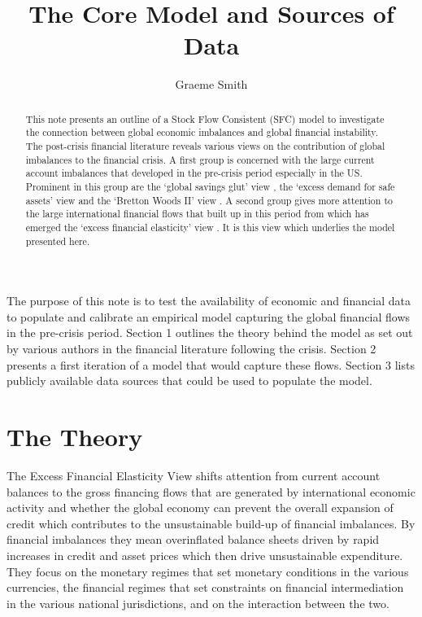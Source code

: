 \documentclass[twoside,a4paper,11pt]{article}
\title{The Core Model and Sources of Data}
\author{Graeme Smith}
\begin{document}
\maketitle
\begin{abstract} This note presents an outline of a Stock Flow Consistent (SFC) model to investigate the connection between global economic imbalances and global financial instability. The post-crisis financial literature reveals various views on the contribution of global imbalances to the financial crisis. A first group is concerned with the large current account imbalances that developed in the pre-crisis period especially in the US. Prominent in this group are the `global savings glut' view \cite{Bernanke2005},  the ‘excess demand for safe assets’ view \cite{Caballero2006} and the ‘Bretton Woods II’ view \cite{Dooley2003}. A second group gives more attention to the large international financial flows that built up in this period from which has emerged the `excess financial elasticity' view \cite{Borio2011b}. It is this view which underlies the model presented here.
\end{abstract}

The purpose of this note is to test the availability of economic and financial data to populate and calibrate an empirical model capturing the global financial flows in the pre-crisis period. Section 1 outlines the theory behind the model as set out by various authors in the financial literature following the crisis. Section 2 presents a first iteration of a model that would capture these flows. Section 3 lists publicly available data sources that could be used to populate the model.

\section{The Theory}
The Excess Financial Elasticity View \cite{Borio2011b} shifts attention  from current account balances to the gross financing flows that are generated by international economic activity and whether the global economy can prevent the overall expansion of credit which contributes to the unsustainable build-up of financial imbalances. By financial imbalances they mean overinflated balance sheets driven by rapid increases in credit and asset prices which then drive unsustainable expenditure. They focus on the monetary regimes that set monetary conditions in the various currencies, the financial regimes that set constraints on financial intermediation in the various national jurisdictions, and on the interaction between the two.
\end{document}
